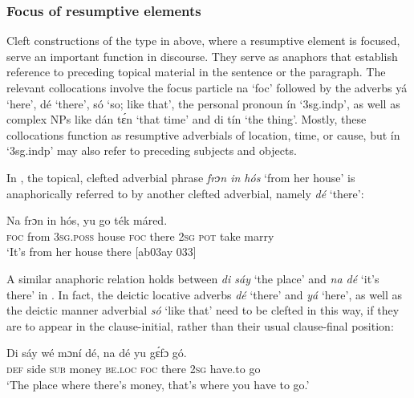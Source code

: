 \subsubsection{Focus of resumptive elements}\label{sec:7.4.3.3}

Cleft constructions of the type in  above, where a resumptive element is focused, serve an important function in discourse{\fff}. They serve as anaphors that establish reference to preceding topical material in the sentence or the paragraph. The relevant collocations involve the focus particle na ‘foc’ followed by the adverbs yá ‘here’, dé ‘there’, só ‘so; like that’, the personal pronoun ín ‘3sg.indp’, as well as complex NPs like dán tɛ́n ‘that time’ and di tín ‘the thing’. Mostly, these collocations function as resumptive adverbials of location, time, or cause, but ín ‘3sg.indp’ may also refer to preceding subjects and objects{\fff}. 


In , the topical, clefted adverbial phrase \textit{frɔn in hós} ‘from her house’ is anaphorically referred to by another clefted adverbial, namely \textit{dé} ‘there’: 



\ea%
    \label{ex:key:717}
    \gll Na  frɔn    in    hós,          yu  go  ték    máred.\\
\textsc{foc}  from  \textsc{3sg.poss}  house  \textsc{foc}  there  \textsc{2sg}  \textsc{pot}  take    marry\\

\glt ‘It’s from her house there [ab03ay 033]
\z

A similar anaphoric relation holds between \textit{di sáy} ‘the place’ and \textit{na dé} ‘it’s there’ in . In fact, the deictic locative adverbs \textit{dé} ‘there’ and \textit{yá} ‘here’, as well as the deictic manner adverbial \textit{só} ‘like that’ need to be clefted in this way, if they are to appear in the clause-initial, rather than their usual clause-final position:


\ea%
    \label{ex:key:718}
    \gll Di  sáy  wé  mɔní  dé,    na  dé    yu  gɛ́fɔ    gó.\\
\textsc{def}  side   \textsc{sub}  money  \textsc{be.loc}  \textsc{foc}  there  \textsc{2sg}  have.to  go\\

\glt ‘The place where there’s money, that’s where you have to go.’
\z

